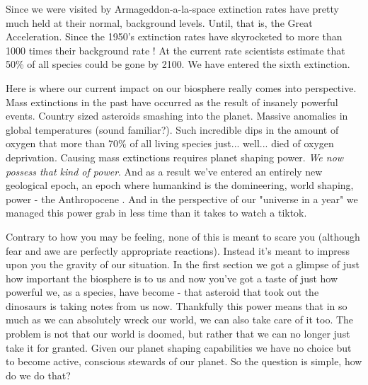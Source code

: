 \documentclass[11pt,a5paper]{book}
\begin{document}
Since we were visited by Armageddon-a-la-space extinction rates have pretty much held at their normal, background levels. Until, that is, the Great Acceleration. Since the 1950's extinction rates have skyrocketed to more than 1000 times their background rate \cite{wwf}! At the current rate scientists estimate that 50\% of all species could be gone by 2100. We have entered the sixth extinction. 

Here is where our current impact on our biosphere really comes into perspective. Mass extinctions in the past have occurred as the result of insanely powerful events. Country sized asteroids smashing into the planet. Massive anomalies in global temperatures (sound familiar?). Such incredible dips in the amount of oxygen that more than 70\% of all living species just... well... died of oxygen deprivation. Causing mass extinctions requires planet shaping power. \textit{We now possess that kind of power}. And as a result we've entered an entirely new geological epoch, an epoch where humankind is the domineering, world shaping, power - the Anthropocene \cite{eellis}. And in the perspective of our "universe in a year" we managed this power grab in less time than it takes to watch a tiktok.
\newline

Contrary to how you may be feeling, none of this is meant to scare you (although fear and awe are perfectly appropriate reactions). Instead it's meant to impress upon you the gravity of our situation. In the first section we got a glimpse of just how important the biosphere is to us and now you've got a taste of just how powerful we, as a species, have become - that asteroid that took out the dinosaurs is taking notes from us now. Thankfully this power means that in so much as we can absolutely wreck our world, we can also take care of it too. The problem is not that our world is doomed, but rather that we can no longer just take it for granted. Given our planet shaping capabilities we have no choice but to become active, conscious stewards of our planet. So the question is simple, how do we do that?
\end{document}
